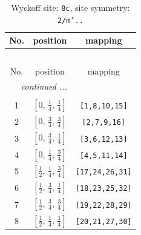 \documentclass[fleqn,8pt]{jsarticle}
\begin{document}
\renewcommand{\arraystretch}{1.2}
\begin{longtable}{ccc}
\caption{Wyckoff site: {\tt 8c}, site symmetry: {\tt 2/m'..}}
 \\
 \hline \hline
No. & position & mapping \\ \hline \endfirsthead

\multicolumn{2}{l}{\tablename\ \thetable{}} \\
 \hline \hline
No. & position & mapping \\ \hline \endhead

 \hline \hline
\multicolumn{2}{r}{\footnotesize\it continued ...} \\ \endfoot

 \hline \hline
\multicolumn{2}{r}{} \\ \endlastfoot

1 & $\left[ 0,\, \frac{1}{4},\, \frac{1}{4} \right]$ & {\tt [1,8,10,15]} \\ \hline
2 & $\left[ 0,\, \frac{3}{4},\, \frac{3}{4} \right]$ & {\tt [2,7,9,16]} \\ \hline
3 & $\left[ 0,\, \frac{3}{4},\, \frac{1}{4} \right]$ & {\tt [3,6,12,13]} \\ \hline
4 & $\left[ 0,\, \frac{1}{4},\, \frac{3}{4} \right]$ & {\tt [4,5,11,14]} \\ \hline
5 & $\left[ \frac{1}{2},\, \frac{1}{4},\, \frac{3}{4} \right]$ & {\tt [17,24,26,31]} \\ \hline
6 & $\left[ \frac{1}{2},\, \frac{3}{4},\, \frac{1}{4} \right]$ & {\tt [18,23,25,32]} \\ \hline
7 & $\left[ \frac{1}{2},\, \frac{3}{4},\, \frac{3}{4} \right]$ & {\tt [19,22,28,29]} \\ \hline
8 & $\left[ \frac{1}{2},\, \frac{1}{4},\, \frac{1}{4} \right]$ & {\tt [20,21,27,30]} \\
\end{longtable}
\renewcommand{\arraystretch}{1.2}
\end{document}
